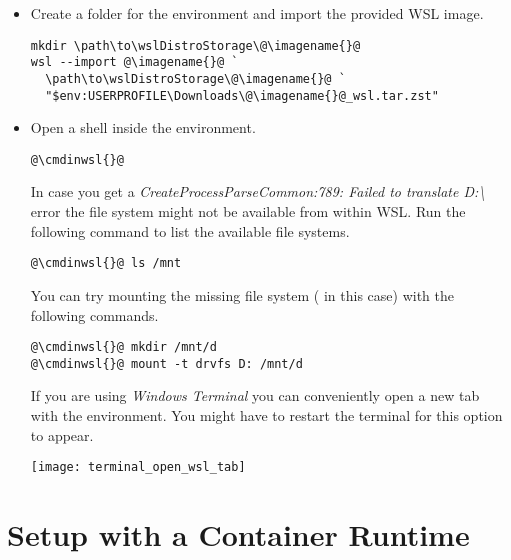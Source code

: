 \begin{itemize}
\begin{infobox}
        \end{infobox}

  \item Create a folder for the environment and import the provided WSL image.
        \begin{lstlisting}
mkdir \path\to\wslDistroStorage\@\imagename{}@
wsl --import @\imagename{}@ `
  \path\to\wslDistroStorage\@\imagename{}@ `
  "$env:USERPROFILE\Downloads\@\imagename{}@_wsl.tar.zst"
\end{lstlisting}

  \item Open a shell inside the environment.

        \begin{lstlisting}
@\cmdinwsl{}@
\end{lstlisting}

        \begin{infobox}
          In case you get a \emph{CreateProcessParseCommon:789: Failed to translate D:\textbackslash} error the file system might not be available from within WSL.
          Run the following command to list the available file systems.

          \begin{lstlisting}
@\cmdinwsl{}@ ls /mnt
\end{lstlisting}

          You can try mounting the missing file system ( in this case) with the following commands.

          \begin{lstlisting}
@\cmdinwsl{}@ mkdir /mnt/d
@\cmdinwsl{}@ mount -t drvfs D: /mnt/d
\end{lstlisting}
        \end{infobox}
        \begin{infobox}
          If you are using \emph{Windows Terminal} you can conveniently open a new tab with the environment.
          You might have to restart the terminal for this option to appear.
          \begin{center}
            \texttt{[image: terminal\_open\_wsl\_tab]}
          \end{center}
        \end{infobox}
\end{itemize}

\newpage

\section{Setup with a Container Runtime}

